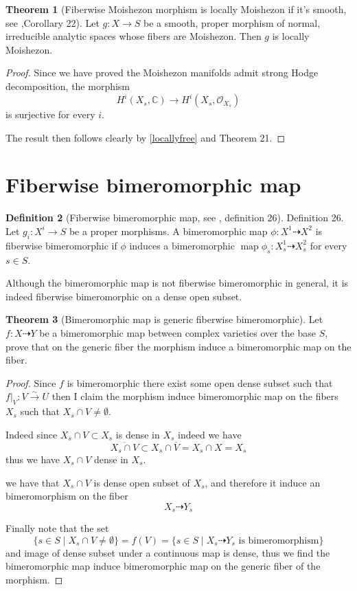 \documentclass[11pt]{article}
\theoremstyle{definition}
\newtheorem{theorem}{Theorem}
\newtheorem{definition}[theorem]{Definition}
\begin{document}
	\begin{theorem}[Fiberwise Moishezon morphism is locally Moishezon if it's smooth, see \cite{Moishezonmorphism},Corollary 22]
		Let $g: X \rightarrow S$ be a smooth, proper morphism of normal, irreducible analytic spaces whose fibers are Moishezon. Then $g$ is locally Moishezon.
	\end{theorem}
	\begin{proof}
		Since we have proved the Moishezon manifolds admit strong Hodge decomposition, the morphism $$H^i\left(X_s, \mathbb{C}\right) \rightarrow H^i\left(X_s, \mathcal{O}_{X_s}\right)$$ is surjective for every $i$.
		
		The result then follows clearly by \ref{locallyfree} and \cite{Moishezonmorphism} Theorem 21. 
	\end{proof}
	\section{Fiberwise bimeromorphic map}
	\begin{definition}[Fiberwise bimeromorphic map, see \cite{Moishezonmorphism}, definition 26]
		Definition 26. Let $g_i: X^i \rightarrow S$ be a proper morphisms. A bimeromorphic map $\phi: X^1 \dashrightarrow X^2$ is fiberwise bimeromorphic if $\phi$ induces a bimeromorphic $\operatorname{map} \phi_s: X_s^1 \dashrightarrow X_s^2$ for every $s \in S$.
	\end{definition}
	Although the bimeromorphic map is not fiberwise bimeromorphic in general, it is indeed fiberwise bimeromorphic on a dense open subset.
	\begin{theorem}[Bimeromorphic map is generic fiberwise bimeromorphic]\label{fiberwisebimero}
		Let $f:X \dashrightarrow Y$ be a bimeromorphic map between complex varieties over the base $S$, prove that on the generic fiber the morphism induce a bimeromorphic map on the fiber.
	\end{theorem}
	\begin{proof}
	Since $f$ is bimeromorphic there exist some open dense subset such that $f|_V : V \stackrel{\sim}\to U$ then I claim the morphism induce bimeromorphic map on the fibers $X_s$ such that $X_s \cap V \ne \emptyset$.
	
	Indeed since $X_s \cap V \subset X_s$ is dense in $X_s$ indeed we have $$\overline{X_s \cap V} \subset X_s \cap \overline{V} = X_s \cap X = X_s$$thus we have $X_s\cap V$ dense in $X_s$. 
	
	we have that $X_s\cap V$ is dense open subset of $X_s$, and therefore it induce an bimeromorphism on the fiber $$X_s \dashrightarrow Y_s$$
	
	Finally note that the set $$\{s\in S \mid X_s \cap V \ne \emptyset \} = f(V) = \{s\in S \mid X_s \dashrightarrow Y_s \text{ is bimeromorphism}\}$$ and image of dense subset under a continuous map is dense, thus we find the bimeromorphic map induce bimeromorphic map on the generic fiber of the morphism.
	
	\end{proof}
\end{document}
